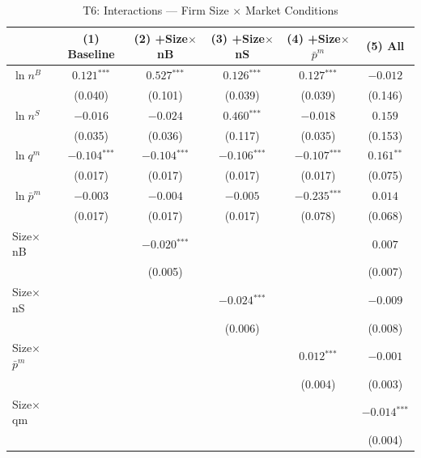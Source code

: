 \documentclass[12pt]{article}
\newcommand{\sym}[1]{\ensuremath{^{\text{#1}}}}
\newcommand{\se}[1]{{\small(#1)}}
\newcommand{\mis}{}
\begin{document}
\begin{landscape}
\begin{table}[H]
  \centering
  \caption{T6: Interactions --- Firm Size \(\times\) Market Conditions}
  \label{tab:t6}
  \begin{threeparttable}
    \begin{tabular}{lccccc}
      \toprule
      & (1) Baseline & (2) +Size\(\times\)nB & (3) +Size\(\times\)nS
        & (4) +Size\(\times\)\(\bar{p}^m\) & (5) All \\
      \midrule
      \(\ln n^{B}\) & \(0.121\sym{***}\) & \(0.527\sym{***}\) & \(0.126\sym{***}\) & \(0.127\sym{***}\) & \(-0.012\) \\
                    & \se{0.040} & \se{0.101} & \se{0.039} & \se{0.039} & \se{0.146} \\[4pt]
      \(\ln n^{S}\) & \(-0.016\) & \(-0.024\) & \(0.460\sym{***}\) & \(-0.018\) & \(0.159\) \\
                    & \se{0.035} & \se{0.036} & \se{0.117} & \se{0.035} & \se{0.153} \\[4pt]
      \(\ln q^{m}\) & \(-0.104\sym{***}\) & \(-0.104\sym{***}\) & \(-0.106\sym{***}\) & \(-0.107\sym{***}\) & \(0.161\sym{**}\) \\
                    & \se{0.017} & \se{0.017} & \se{0.017} & \se{0.017} & \se{0.075} \\[4pt]
      \(\ln \bar{p}^{m}\) & \(-0.003\) & \(-0.004\) & \(-0.005\) & \(-0.235\sym{***}\) & \(0.014\) \\
                          & \se{0.017} & \se{0.017} & \se{0.017} & \se{0.078} & \se{0.068} \\[4pt]
      Size\(\times\)nB & \mis & \(-0.020\sym{***}\) & \mis & \mis & \(0.007\) \\
                       &     & \se{0.005}          &     &     & \se{0.007} \\[4pt]
      Size\(\times\)nS & \mis & \mis & \(-0.024\sym{***}\) & \mis & \(-0.009\) \\
                       &     &     & \se{0.006}           &     & \se{0.008} \\[4pt]
      Size\(\times\)\(\bar{p}^m\) & \mis & \mis & \mis & \(0.012\sym{***}\) & \(-0.001\) \\
                                  &     &     &     & \se{0.004}          & \se{0.003} \\[4pt]
      Size\(\times\)qm & \mis & \mis & \mis & \mis & \(-0.014\sym{***}\) \\
                       &     &     &     &     & \se{0.004} \\[4pt]

\end{tabular}
\end{threeparttable}
\end{table}
\end{landscape}
\end{document}
